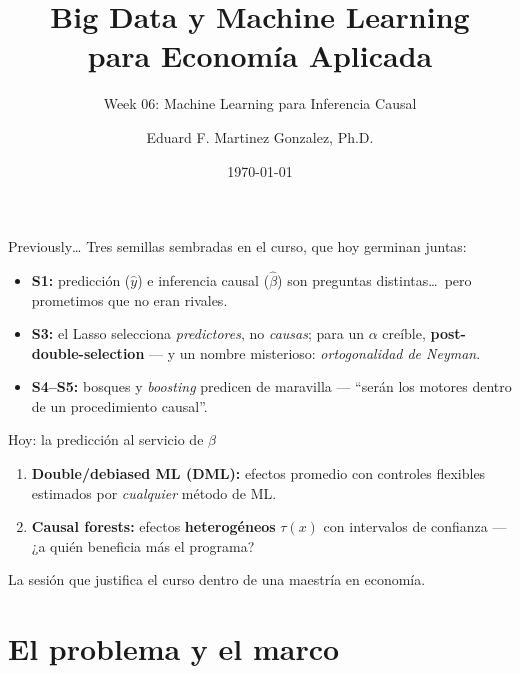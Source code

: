 \documentclass{beamer}
\title[BDML]{Big Data y Machine Learning \\ para Economía Aplicada}
\subtitle{Week 06: Machine Learning para Inferencia Causal}
\author{Eduard F. Martinez Gonzalez, Ph.D.}
\institute[]{Departamento de Economía, Universidad Icesi}
\date{\today}
\newcommand{\1}{\mathbb{I}}
\begin{document}
\begin{frame}
\titlepage
\end{frame}

\begin{frame}{Previously\ldots}
\small
Tres semillas sembradas en el curso, que hoy germinan juntas:
\begin{itemize}\itemsep5pt
  \item \textbf{S1:} predicción ($\hat{y}$) e inferencia causal ($\hat{\beta}$) son preguntas distintas\ldots\ pero prometimos que no eran rivales.
  \item \textbf{S3:} el Lasso selecciona \emph{predictores}, no \emph{causas}; para un $\alpha$ creíble, \textbf{post-double-selection} --- y un nombre misterioso: \emph{ortogonalidad de Neyman}.
  \item \textbf{S4--S5:} bosques y \emph{boosting} predicen de maravilla --- ``serán los motores dentro de un procedimiento causal''.
\end{itemize}
\pause

\vspace{0.2cm}
\begin{block}{Hoy: la predicción al servicio de $\beta$}
\begin{enumerate}\itemsep2pt
  \item \textbf{Double/debiased ML (DML):} efectos promedio con controles flexibles estimados por \emph{cualquier} método de ML.
  \item \textbf{Causal forests:} efectos \textbf{heterogéneos} $\tau(x)$ con intervalos de confianza --- ¿a quién beneficia más el programa?
\end{enumerate}
La sesión que justifica el curso dentro de una maestría en economía.
\end{block}
\end{frame}


\section{El problema y el marco}
\begin{frame}[noframenumbering]
\tableofcontents[currentsection]
\end{frame}
\end{document}

